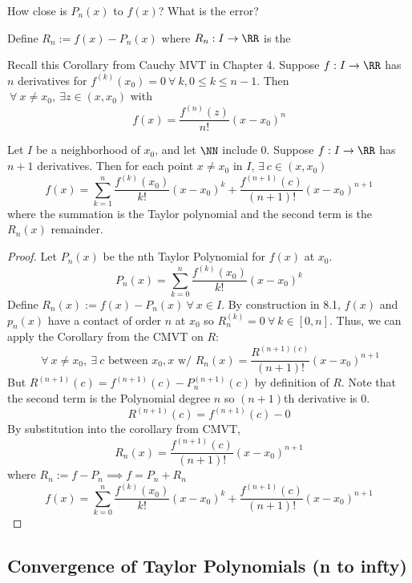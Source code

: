 \documentclass[12pt]{scrartcl}
\begin{document}
How close is $P_n(x)$ to $f(x)$? What is the error?

\begin{definition}
  Define $R_n := f(x) - P_n(x)$ where $R_n: I \to \RR$ is the 
\end{definition}

\begin{note}
  Recall this Corollary from Cauchy MVT in Chapter 4. 
  Suppose $f: I \to \RR$ has $n$ derivatives for $f^{(k)}(x_0) = 0 \ \forall \ k, 0 \leq k \leq n-1$. 
  Then $\ \forall \ x \neq x_0, \ \exists z \in (x, x_0)$ with 
  \[f(x) = \frac{f^{(n)}(z)}{n!}(x-x_0)^n\]
\end{note}

\begin{theorem}
  Let $I$ be a neighborhood of $x_0$, and let $\NN$ include $0$. 
  Suppose $f: I \to \RR$ has $n + 1$ derivatives. Then for each point $x \neq x_0$ in $I$, $\exists \ c \in (x, x_0)$
  \[f(x) = \sum_{k=1}^n \frac{f^{(k)}(x_0)}{k!}(x-x_0)^k + \frac{f^{(n+1)}(c)}{(n+1)!}(x-x_0)^{n+1}\]
  where the summation is the Taylor polynomial and the second term is the $R_n(x)$ remainder.

  \begin{proof}
    Let $P_n(x)$ be the nth Taylor Polynomial for $f(x)$ at $x_0$. 
    \[P_n(x) = \sum_{k=0}^n \frac{f^{(k)}(x_0)}{k!}(x-x_0)^k\]
    Define $R_n(x) := f(x) - P_n(x) \ \forall \ x \in I$. By construction in 8.1, 
    $f(x)$ and $p_n(x)$ have a contact of order $n$ at $x_0$
    so $R_n^{(k)} = 0 \ \forall \ k \in [0, n]$. Thus, we can apply the Corollary from the CMVT on $R$:
    \[\ \forall \ x \neq x_0, \ \exists \ c \text{ between } x_0, x \text{ w/ } R_n(x) = \frac{R^{(n+1)(c)}}{(n+1)!}(x-x_0)^{n+1}\]
    But $R^{(n+1)}(c) = f^{(n+1)}(c) - P_n^{(n+1)}(c)$ by definition of $R$. 
    Note that the second term is the Polynomial degree $n$ so $(n+1)$th derivative is $0$.
    \[R^{(n+1)}(c) = f^{(n+1)}(c) - 0\]
    By substitution into the corollary from CMVT, 
    \[R_n(x) = \frac{f^{(n+1)}(c)}{(n+1)!}(x-x_0)^{n+1}\]
    where $R_n := f - P_n \implies f = P_n + R_n$
    \[f(x) = \sum_{k=0}^n \frac{f^{(k)}(x_0)}{k!}(x-x_0)^k + \frac{f^{(n+1)}(c)}{(n+1)!}(x-x_0)^{n+1}\]
  \end{proof}
\end{theorem}

\subsection{Convergence of Taylor Polynomials (n to infty)}
\end{document}
